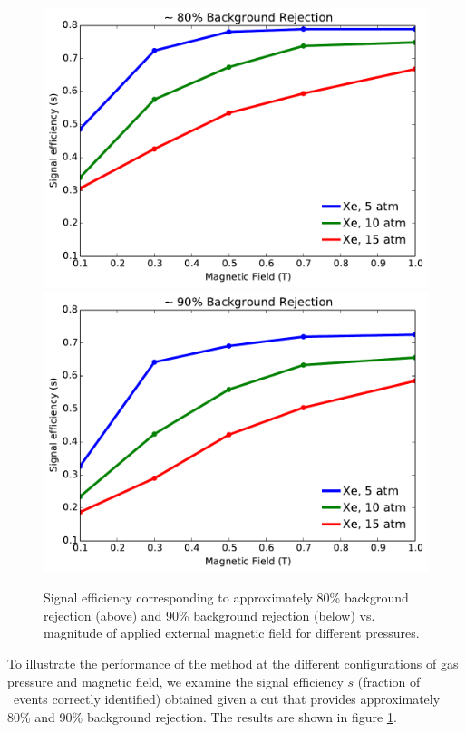 \documentclass{JINST}
\begin{document}
\begin{figure}[!htb]
	\centering
	\includegraphics[scale=0.6]{fig/eff_vs_b_80.pdf} \\
	\includegraphics[scale=0.6]{fig/eff_vs_b_90.pdf}
	\caption{\label{fig_config}Signal efficiency corresponding to approximately 80\% background rejection (above) and 90\% background rejection (below) vs. magnitude of applied external magnetic field for different pressures.}
\end{figure}

To illustrate the performance of the method at the different configurations of gas pressure and magnetic 
field, we examine the signal efficiency $s$ (fraction of \bbonu\ events correctly identified) obtained 
given a cut that provides approximately 80\% and 90\% background rejection.  The results are shown in figure 
\ref{fig_config}.
\end{document}
